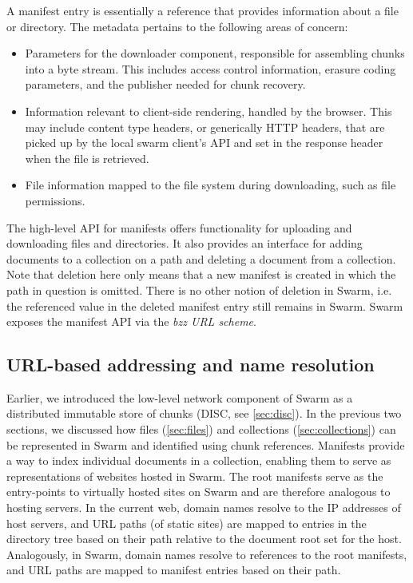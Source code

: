 A manifest entry is essentially a reference that provides information about a file or directory.
The metadata pertains to the following areas of concern: 

\begin{itemize}
  \item Parameters for the downloader component, responsible for assembling chunks into a byte stream. This includes access control information, erasure coding parameters, and the publisher needed for chunk recovery.
%
  \item Information relevant to client-side rendering, handled by the browser. This may include content type headers, or generically HTTP headers, that are picked up by the local swarm client's API and set in the response header when the file is retrieved.
%  
  \item File information mapped to the file system during downloading, such as file permissions.
\end{itemize}

The high-level API for manifests offers functionality for uploading and downloading files and directories. It also provides an interface for adding documents to a collection on a path and deleting a document from a collection. Note that deletion here only means that a new manifest is created in which the path in question is omitted. There is no other notion of deletion in Swarm, i.e. the referenced value in the deleted manifest entry still remains in Swarm. Swarm exposes the manifest API via the \emph{bzz URL scheme}.

\subsection{URL-based addressing and name resolution\statusgreen}\label{sec:urls}

Earlier, we introduced the low-level network component of Swarm as a distributed immutable store of chunks (DISC, see \ref{sec:disc}). In the previous two sections, we discussed how files (\ref{sec:files}) and collections (\ref{sec:collections}) can be represented in Swarm and identified using chunk references. Manifests provide a way to index individual documents in a collection, enabling them to serve as representations of websites hosted in Swarm. The root manifests serve as the entry-points to virtually hosted sites on Swarm and are therefore analogous to hosting servers. In the current web, domain names resolve to the IP addresses of host servers, and URL paths (of static sites) are mapped to entries in the directory tree based on their path relative to the document root set for the host.
Analogously, in Swarm, domain names resolve to references to the root manifests, and URL paths are mapped to manifest entries based on their path.  

